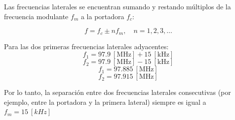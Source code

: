 Las frecuencias laterales se encuentran sumando y restando múltiplos de la frecuencia modulante \( f_m \) a la portadora \( f_c \):

    \[
        f = f_c \pm n f_m, \quad n = 1, 2, 3, \dots
    \]

Para las dos primeras frecuencias laterales adyacentes:
    \[
        f_{1} = 97.9~[\text{MHz}] + 15~[\text{kHz}]
    \]
    \[
        f_{2} = 97.9~[\text{MHz}] - 15~[\text{kHz}]
    \]
    \[
        f_{1} = 97.885~[\text{MHz}]
    \]
    \[
        f_{2} = 97.915~[\text{MHz}]
    \]

Por lo tanto, la separación entre dos frecuencias laterales consecutivas (por ejemplo, entre la portadora y la primera lateral) siempre es igual a 
$f_m = 15~[kHz]$